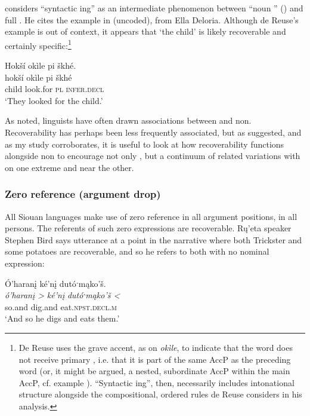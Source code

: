 \documentclass[output=paper]{LSP/langsci}
\begin{document}
 considers “syntactic ing” as an intermediate phenomenon between “noun ” () and full . He cites the example in  (uncoded), from Ella Deloria. Although de Reuse’s example is out of context, it appears that `the child' is likely recoverable and certainly specific:\footnote{De Reuse uses the grave accent, as on \emph{okìle}, to indicate that the word does not receive primary , i.e. that it is part of the same AccP as the preceding word (or, it might be argued, a nested, subordinate AccP within the main AccP, cf. example ). “Syntactic ing”, then, necessarily includes intonational structure alongside the compositional, ordered rules de Reuse considers in his analysis.}

\ea\label{deloriachild}
 	Hokší okìle pi škhé.\footnotemark\\
\gll	hokší		okìle		pi			škhé\\
	child		look.for	\textsc{pl}		\textsc{infer.decl}\\
\glt	`They looked for the child.' 
\z

	As \citet{Graczyk1991a} noted, linguists have often drawn associations between  and non. Recoverability has perhaps been less frequently associated, but as \citet{deReuse1994} suggested, and as my study corroborates, it is useful to look at how recoverability functions alongside non to encourage not only , but a continuum of related variations with  on one extreme and  near the other.
	
\subsubsection{Zero reference (argument drop)}\label{zeroreference}

	All Siouan languages make use of zero reference in all argument positions, in all persons. The referents of such zero expressions are recoverable. Rų’eta speaker Stephen Bird says utterance  at a point in the narrative where both Trickster and some potatoes are recoverable, and so he refers to both with no nominal expression:
	
\ea\label{ruetazero}
 	Ó’haranį ké’nį dutóˑmąko’š.\footnotemark\\
\gll 	\emph{ó’haranį >}	\emph{ké’nį}		\emph{dutóˑmąko’š <}\\
	so.and		dig.and		eat.\textsc{npst.decl.m}\\
\glt	`And so he digs and eats them.'
\z
\end{document}

